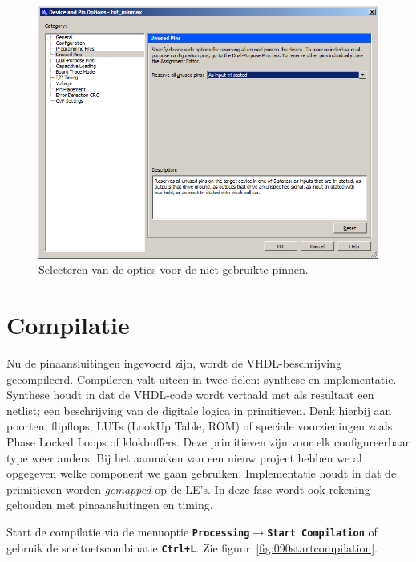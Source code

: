 \documentclass[a4paper,12pt,fleqn,twoside]{book}
\def\tutpicscale{0.455}
\newcommand{\menu}[1]{\texttt{\textbf{#1}}}
\def\pijl{$\rightarrow$}%
\begin{document}
\begin{figure}[H]
\centering
\includegraphics[scale=\tutpicscale]{087selecttristate.png}
\caption{Selecteren van de opties voor de niet-gebruikte pinnen.}
\label{fig:087selecttristate}
\end{figure}


\section{Compilatie}
\label{sec:compilatie}
Nu de pinaansluitingen ingevoerd zijn, wordt de VHDL-beschrijving gecompileerd. Compileren 
valt uiteen in twee delen: synthese en implementatie. Synthese houdt in dat de VHDL-code wordt 
vertaald met als resultaat een netlist; een beschrijving van de digitale logica in primitieven. Denk 
hierbij aan poorten, flipflops, LUTs (LookUp Table, ROM) of speciale voorzieningen zoals 
Phase Locked Loops of klokbuffers. Deze primitieven zijn voor elk configureerbaar type weer 
anders. Bij het aanmaken van een nieuw project hebben we al opgegeven welke component we 
gaan gebruiken. Implementatie houdt in dat de primitieven worden \textsl{gemapped} op de LE's. In 
deze fase wordt ook rekening gehouden met pinaansluitingen en timing.

Start de compilatie via de menuoptie \menu{Processing\pijl{}Start Compilation} of gebruik de 
sneltoetscombinatie \menu{Ctrl+L}. Zie figuur~\ref{fig:090startcompilation}.
 
\end{document}
